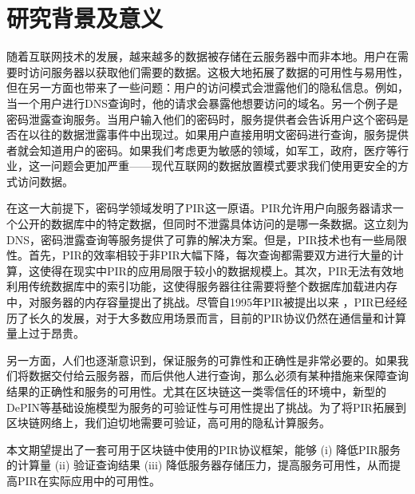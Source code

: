 \section{研究背景及意义}


随着互联网技术的发展，越来越多的数据被存储在云服务器中而非本地。用户在需要时访问服务器以获取他们需要的数据。这极大地拓展了数据的可用性与易用性，但在另一方面也带来了一些问题：用户的访问模式会泄露他们的隐私信息。例如，当一个用户进行DNS查询时，他的请求会暴露他想要访问的域名。另一个例子是密码泄露查询服务。当用户输入他们的密码时，服务提供者会告诉用户这个密码是否在以往的数据泄露事件中出现过。如果用户直接用明文密码进行查询，服务提供者就会知道用户的密码。如果我们考虑更为敏感的领域，如军工，政府，医疗等行业，这一问题会更加严重——现代互联网的数据放置模式要求我们使用更安全的方式访问数据。

在这一大前提下，密码学领域发明了PIR这一原语。PIR允许用户向服务器请求一个公开的数据库中的特定数据，但同时不泄露具体访问的是哪一条数据。这立刻为DNS，密码泄露查询等服务提供了可靠的解决方案。但是，PIR技术也有一些局限性。首先，PIR的效率相较于非PIR大幅下降，每次查询都需要双方进行大量的计算，这使得在现实中PIR的应用局限于较小的数据规模上。其次，PIR无法有效地利用传统数据库中的索引功能，这使得服务器往往需要将整个数据库加载进内存中，对服务器的内存容量提出了挑战。尽管自1995年PIR被提出以来 \cite{FOCS:CGKS95}，PIR已经经历了长久的发展，对于大多数应用场景而言，目前的PIR协议仍然在通信量和计算量上过于昂贵。

另一方面，人们也逐渐意识到，保证服务的可靠性和正确性是非常必要的。如果我们将数据交付给云服务器，而后供他人进行查询，那么必须有某种措施来保障查询结果的正确性和服务的可用性。尤其在区块链这一类零信任的环境中，新型的DePIN等基础设施模型为服务的可验证性与可用性提出了挑战。为了将PIR拓展到区块链网络上，我们迫切地需要可验证，高可用的隐私计算服务。

本文期望提出了一套可用于区块链中使用的PIR协议框架，能够 (i) 降低PIR服务的计算量 (ii) 验证查询结果 (iii) 降低服务器存储压力，提高服务可用性，从而提高PIR在实际应用中的可用性。